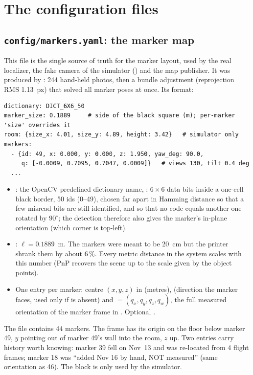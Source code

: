 \section{The configuration files}

\subsection{\texttt{config/markers.yaml}: the marker map}

This file is the single source of truth for the marker layout, used by the real localizer, the fake camera of the
simulator () and the map publisher. It was produced by : 244 hand-held
photos, then a bundle adjustment (reprojection RMS 1.13~px) that solved all marker poses at once. Its format:

\begin{lstlisting}
dictionary: DICT_6X6_50
marker_size: 0.1889     # side of the black square (m); per-marker 'size' overrides it
room: {size_x: 4.01, size_y: 4.89, height: 3.42}   # simulator only
markers:
  - {id: 49, x: 0.000, y: 0.000, z: 1.950, yaw_deg: 90.0,
     q: [-0.0009, 0.7095, 0.7047, 0.0009]}   # views 130, tilt 0.4 deg
  ...
\end{lstlisting}

\begin{itemize}
\item {}: the OpenCV predefined dictionary name, : $6\times 6$ data bits inside a
  one-cell black border, 50 ids (0--49), chosen far apart in Hamming distance so that a few misread bits are still
  identified, and so that no code equals another one rotated by $90^\circ$; the detection therefore also gives the
  marker's in-plane orientation (which corner is top-left).
\item {}: $\ell = 0.1889$~m. The markers were meant to be 20~cm but the printer shrank them by about
  6\,\%. Every metric distance in the system scales with this number (PnP recovers the scene up to the scale given by
  the object points).
\item One entry per marker: centre $(x,y,z)$ in  (metres),  (direction the marker faces,
  used only if  is absent) and  $= (q_x,q_y,q_z,q_w)$, the full measured orientation of the marker
  frame in . Optional .
\end{itemize}

The file contains 44 markers. The  frame has its origin on the floor below marker 49, $y$ pointing out of
marker 49's wall into the room, $z$ up. Two entries carry history worth knowing: marker 39 fell on Nov~13 and was
re-located from 4 flight frames; marker 18 was ``added Nov 16 by hand, NOT measured'' (same orientation as 46). The
 block is only used by the simulator.

